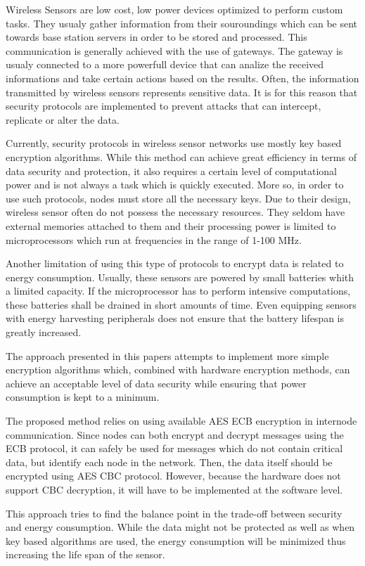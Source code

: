 Wireless Sensors are low cost, low power devices optimized to perform custom tasks. They usualy gather information from their souroundings which can be sent towards base station servers in order to be stored and processed. This communication is generally achieved with the use of gateways. The gateway is usualy connected to a more powerfull device that can analize the received informations and take certain actions based on the results. Often, the information transmitted by wireless sensors represents sensitive data. It is for this reason that security protocols are implemented to prevent attacks that can intercept, replicate or alter the data.

Currently, security protocols in wireless sensor networks use mostly key based encryption algorithms. While this method can achieve 
great efficiency in terms of data security and protection, it also requires a certain level of computational power and is not 
always a task which is quickly executed. More so, in order to use such protocols, nodes must store all the necessary keys.
Due to their design, wireless sensor often do not possess the necessary resources. They seldom have external memories attached 
to them and their processing power is limited to microprocessors which run at frequencies in the range of 1-100 MHz.

Another limitation of using this type of protocols to encrypt data is related to energy consumption. Usually, these sensors are 
powered by small batteries whith a limited capacity. If the microprocessor has to perform intensive computations, these batteries 
shall be drained in short amounts of time. Even equipping sensors with energy harvesting peripherals does not ensure that 
the battery lifespan is greatly increased.

The approach presented in this papers attempts to implement more simple encryption algorithms which, combined with hardware 
encryption methods, can achieve an acceptable level of data security while ensuring that power consumption is kept to a minimum.

The proposed method relies on using available AES ECB encryption in internode communication. Since nodes can both encrypt and decrypt 
messages using the ECB protocol, it can safely be used for messages which do not contain critical data, but identify each node in the 
network. Then, the data itself should be encrypted using AES CBC protocol. However, because the hardware does not support CBC decryption, 
it will have to be implemented at the software level.

This approach tries to find the balance point in the trade-off between security and energy consumption. While the data might not be 
protected as well as when key based algorithms are used, the energy consumption will be minimized thus increasing the life span of the sensor.
